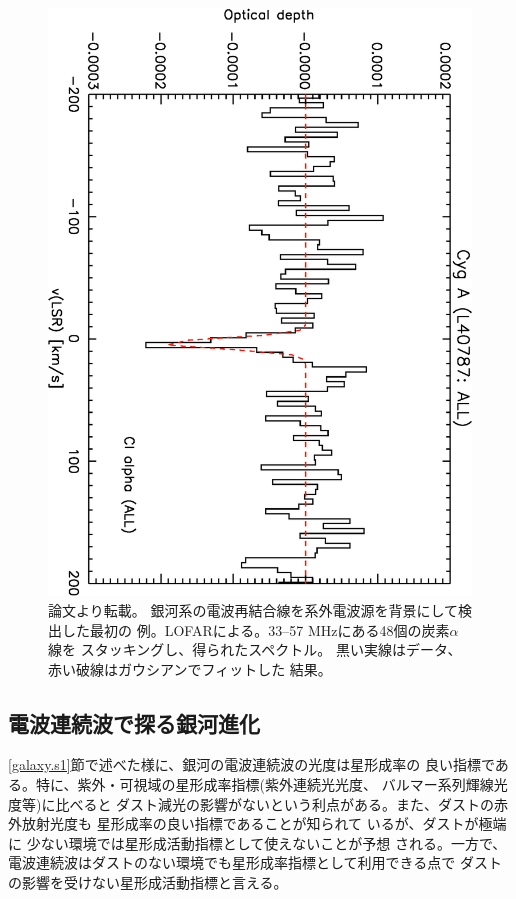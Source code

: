 \begin{figure}[tbp]
\begin{center}
\includegraphics[width=0.6\linewidth,angle=90]{galaxy/oonk_rrl.eps}
\end{center}
\caption{論文\citep{2014MNRAS.437.3506O}より転載。
銀河系の電波再結合線を系外電波源を背景にして検出した最初の
例。LOFARによる。33--57 MHzにある48個の炭素$\alpha$線を
スタッキングし、得られたスペクトル。
黒い実線はデータ、赤い破線はガウシアンでフィットした
結果。}
\label{fig:oonk}
\end{figure}



\subsection{電波連続波で探る銀河進化}
\label{subsec:international_cont}

\ref{galaxy.s1}節で述べた様に、銀河の電波連続波の光度は星形成率の
良い指標である。特に、紫外・可視域の星形成率指標(紫外連続光光度、
バルマー系列輝線光度等)に比べると
ダスト減光の影響がないという利点がある。また、ダストの赤外放射光度も
星形成率の良い指標であることが知られて
いる\citep[e.g., ][]{1998ARA&A..36..189K,2000PASJ...52..539I}が、ダストが極端に
少ない環境では星形成活動指標として使えないことが予想
される\citep{2001A&A...366...83H}。一方で、
電波連続波はダストのない環境でも星形成率指標として利用できる点で
ダストの影響を受けない星形成活動指標と言える。

